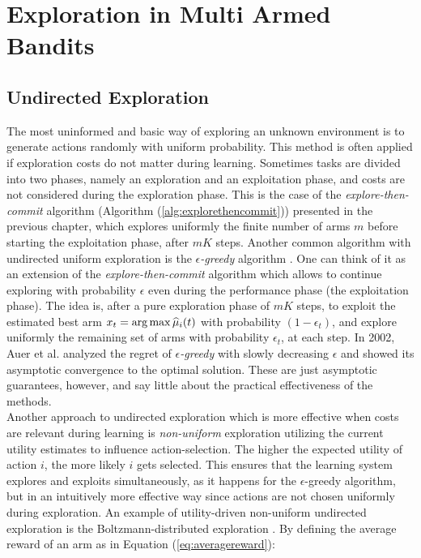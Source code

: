 \section{Exploration in Multi Armed Bandits} \label{sec:expinmab}

\subsection{Undirected Exploration}
The most uninformed and basic way of exploring an unknown environment is to generate actions randomly with uniform probability. This method is often applied if exploration costs do not matter during learning. Sometimes tasks are divided into two phases, namely an exploration and an exploitation phase, and costs are not considered during the exploration phase. This is the case of the \emph{explore-then-commit} algorithm (Algorithm (\ref{alg:explorethencommit})) presented in the previous chapter, which explores uniformly the finite number of arms $m$ before starting the exploitation phase, after $mK$ steps. Another common algorithm with undirected uniform exploration is the $\epsilon$\emph{-greedy} algorithm \cite{lattimore2019bandit}. One can think of it as an extension of the \emph{explore-then-commit} algorithm which allows to continue exploring with probability $\epsilon$ even during the performance phase (\ie the exploitation phase). The idea is, after a pure exploration phase of $mK$ steps, to exploit the estimated best arm $x_t = \arg \max \widehat{\mu}_i(t)$ with probability $(1-\epsilon_t)$, and explore uniformly the remaining set of arms with probability $\epsilon_t$, at each step. In 2002, Auer et al. \cite{auer2002finite} analyzed the regret of $\epsilon$\emph{-greedy} with slowly decreasing $\epsilon$ and showed its asymptotic convergence to the optimal solution. These are just asymptotic guarantees, however, and say little about the practical effectiveness of the methods.\\
Another approach to undirected exploration which is more effective when costs are relevant during learning is \emph{non-uniform} exploration utilizing the current utility estimates to influence action-selection. The higher the expected utility of action $i$, the more likely $i$ gets selected. This ensures that the learning system explores and exploits simultaneously, as it happens for the $\epsilon$-greedy algorithm, but in an intuitively more effective way since actions are not chosen uniformly during exploration. An example of utility-driven non-uniform undirected exploration is the  Boltzmann-distributed exploration \cite{cesa2017boltzmann}. By defining the average reward of an arm as in Equation (\ref{eq:averagereward}):

